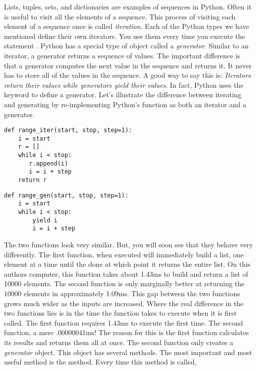 \label{lab:Python_Generators}

Lists, tuples, sets, and dictionaries are examples of sequences in Python.
Often it is useful to visit all the elements of a sequence.  This process of visiting
each element of a sequence once is called \emph{iteration}. 
Each of the Python types we have mentioned define their own iterators.
You use them every time you execute the statement .
Python has a special type of object called a \emph{generator}.
Similar to an iterator, a generator returns a sequence of values.
The important difference is that a generator computes the next value in the sequence and returns it.
It never has to store all of the values in the sequence.
A good way to say this is: \emph{Iterators return their values while generators yield their values}.
In fact, Python uses the  keyword to define a generator.
Let's illustrate the difference between iterating and generating by re-implementing Python's  function
as both an iterator and a generator.
\begin{lstlisting}
def range_iter(start, stop, step=1):
    i = start
    r = []
    while i < stop:
       r.append(i)
       i = i + step
    return r
\end{lstlisting}
\begin{lstlisting}
def range_gen(start, stop, step=1):
    i = start
    while i < stop:
        yield i
        i = i + step
\end{lstlisting}
The two functions look very similar.  But, you will soon see that they behave very differently.
The first function, when executed will immediately build a list, one element at a time until the done
at which point it returns the entire list.  On this authors computer, this function takes about 1.43ms
to build and return a list of 10000 elements.  The second function is only marginally better at
returning the 10000 elements in approximately 1.09ms.  
This gap between the two functions grows much wider as the inputs are increased.
Where the real difference in the two functions lies is in the time the function takes to execute when
it is first called.  The first function requires 1.43ms to execute the first time.  The second function,
a mere .00000041ms!  The reason for this is the first function calculates its results and returns them all at once.  The second function only creates a \emph{generator} object.  This object has several methods.
The most important and most useful method is the  method.  Every time this method is called, 
